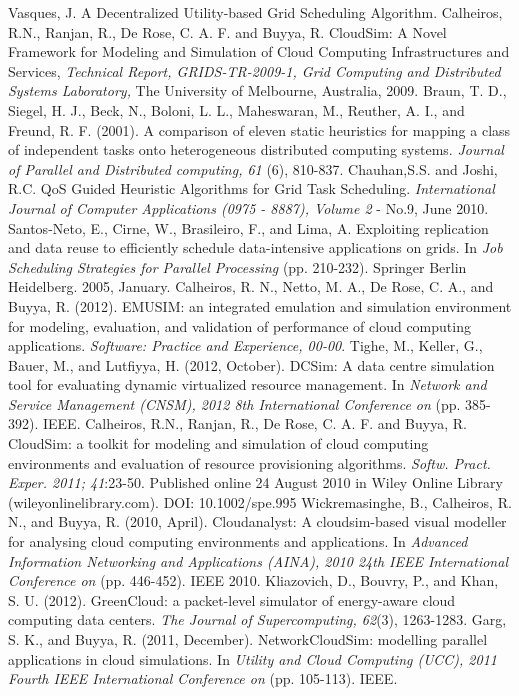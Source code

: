 \documentclass[times, 10pt,twocolumn]{article}
\begin{document}
\begin{thebibliography}{1}

 Vasques, J. A Decentralized Utility-based Grid Scheduling Algorithm.
 Calheiros, R.N., Ranjan, R., De Rose, C. A. F. and Buyya, R. CloudSim: A Novel Framework for Modeling and
 Simulation of Cloud Computing Infrastructures and Services, {\em Technical Report, GRIDS-TR-2009-1, Grid
 Computing and Distributed Systems Laboratory,} The University of Melbourne, Australia, 2009.
 Braun, T. D., Siegel, H. J., Beck, N., Boloni, L. L., Maheswaran, M., Reuther, A. I., and Freund, R. F. (2001). A comparison of eleven static heuristics for mapping a class of independent tasks onto heterogeneous distributed computing systems. {\em Journal of Parallel and Distributed computing, 61} (6), 810-837.
 Chauhan,S.S. and Joshi, R.C. QoS Guided Heuristic Algorithms for Grid Task Scheduling. {\em International Journal of Computer Applications (0975 - 8887), Volume 2} - No.9, June 2010.
 Santos-Neto, E., Cirne, W., Brasileiro, F., and Lima, A. Exploiting replication and data reuse to efficiently schedule data-intensive applications on grids. In {\em Job Scheduling Strategies for Parallel Processing} (pp. 210-232). Springer Berlin Heidelberg. 2005, January.
 Calheiros, R. N., Netto, M. A., De Rose, C. A., and Buyya, R. (2012). EMUSIM: an integrated emulation and simulation environment for modeling, evaluation, and validation of performance of cloud computing applications. {\em Software: Practice and Experience, 00-00}.
 Tighe, M., Keller, G., Bauer, M., and Lutfiyya, H. (2012, October). DCSim: A data centre simulation tool for evaluating dynamic virtualized resource management. In {\em Network and Service Management (CNSM), 2012 8th International Conference on} (pp. 385-392). IEEE.
 Calheiros, R.N., Ranjan, R., De Rose, C. A. F. and Buyya, R. CloudSim: a toolkit for modeling and simulation of cloud computing environments and evaluation of resource provisioning algorithms. {\em Softw. Pract. Exper. 2011; 41}:23-50. Published online 24 August 2010 in Wiley Online Library (wileyonlinelibrary.com). DOI: 10.1002/spe.995
 Wickremasinghe, B., Calheiros, R. N., and Buyya, R. (2010, April). Cloudanalyst: A cloudsim-based visual modeller for analysing cloud computing environments and applications. In {\em Advanced Information Networking and Applications (AINA), 2010 24th IEEE International Conference on} (pp. 446-452). IEEE 2010.
 Kliazovich, D., Bouvry, P., and Khan, S. U. (2012). GreenCloud: a packet-level simulator of energy-aware cloud computing data centers. {\em The Journal of Supercomputing, 62}(3), 1263-1283.
 Garg, S. K., and Buyya, R. (2011, December). NetworkCloudSim: modelling parallel applications in cloud simulations. In {\em Utility and Cloud Computing (UCC), 2011 Fourth IEEE International Conference on} (pp. 105-113). IEEE.
\end{thebibliography}
\end{document}
